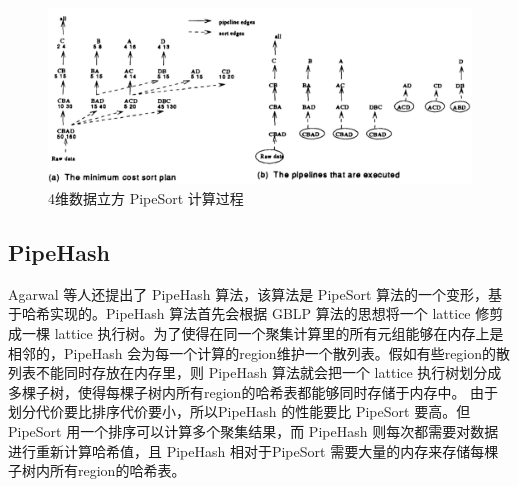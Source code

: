 \begin{figure}[!htb]
\centering\includegraphics[width=5.5in]{picture/ch_current_research/pipesort} 
\caption{4维数据立方 PipeSort 计算过程}\label{pipesort} 
\end{figure} 

\subsection{PipeHash}

Agarwal 等人还提出了 PipeHash 算法\cite{agarwal1996computation}，该算法是 PipeSort 算法的一个变形，基于哈希实现的。PipeHash 算法首先会根据 GBLP 算法的思想将一个 lattice 修剪成一棵 lattice 执行树。为了使得在同一个聚集计算里的所有元组能够在内存上是相邻的，PipeHash 会为每一个计算的region维护一个散列表。假如有些region的散列表不能同时存放在内存里，则 PipeHash 算法就会把一个 lattice 执行树划分成多棵子树，使得每棵子树内所有region的哈希表都能够同时存储于内存中。 由于划分代价要比排序代价要小，所以PipeHash 的性能要比 PipeSort 要高。但 PipeSort 用一个排序可以计算多个聚集结果，而 PipeHash 则每次都需要对数据进行重新计算哈希值，且 PipeHash 相对于PipeSort 需要大量的内存来存储每棵子树内所有region的哈希表。



